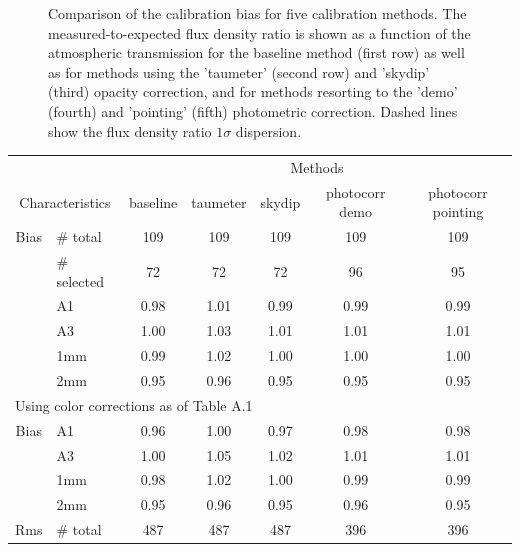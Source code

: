 \begin{figure}[ht!]
\begin{center}
    \caption[Calibration bias comparison]{Comparison of the
      calibration bias for five calibration methods. The measured-to-expected flux density ratio is shown as a
      function of the atmospheric transmission for the baseline method
      (first row) as well as for methods using the 'taumeter' (second
      row) and 'skydip' (third) opacity correction, and for methods
      resorting to the 'demo' (fourth) and 'pointing' (fifth)
      photometric correction. Dashed lines
      show the flux density ratio $1 \sigma $ dispersion.}
    \label{fig:mwc349_obstau_others}
  \end{center}
\end{figure}


\begin{table}[th]
\begin{center}
\begin{tabular}{|c|l|c|c|c|c|c|}
  \hline
  \multicolumn{2}{|c|}{}  &  \multicolumn{5}{|c|}{Methods} \\\cline{3-7}
  \multicolumn{2}{|c|}{Characteristics} &  baseline  & taumeter  &  skydip  &  photocorr demo & photocorr pointing \\
  \hline\hline
  Bias &  $\#$ total    &   109   &   109    &   109    &    109    &  109   \\
       &  $\#$ selected &    72   &   72     &    72    &     96    &   95   \\
       &  A1            &   0.98  &  1.01    &  0.99    &   0.99    &  0.99  \\
       &  A3            &   1.00  &  1.03    &  1.01    &   1.01    &  1.01  \\
       &  1mm           &   0.99  &  1.02    &  1.00    &   1.00    &  1.00  \\
       &  2mm           &   0.95  &  0.96    &  0.95    &   0.95    &  0.95  \\
  \hline
  \multicolumn{7}{|l|}{Using color corrections as of Table A.1} \\
  \hline
  Bias &  A1            &   0.96   &  1.00    &  0.97    &   0.98    &  0.98  \\
       &  A3            &   1.00   &  1.05    &  1.02    &   1.01    &  1.01  \\
       &  1mm           &   0.98   &  1.02    &  1.00    &   0.99    &  0.99  \\
       &  2mm           &   0.95   &  0.96    &  0.95    &   0.96    &  0.95  \\
  Rms  &  $\#$ total    &   487    &    487   &    487    &    396    &  396 \\

\end{tabular}
\end{center}
\end{table}
